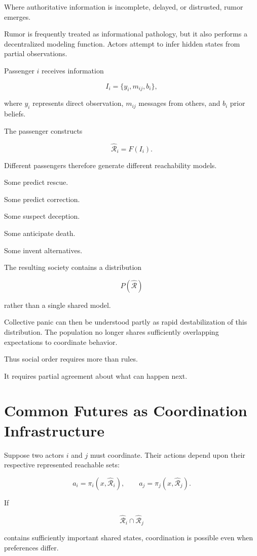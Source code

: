 \documentclass[11pt,oneside]{book}
\theoremstyle{definition}
\theoremstyle{remark}
\newcommand{\R}{\mathcal{R}}
\begin{document}
Where authoritative information is incomplete, delayed, or distrusted, rumor emerges.

Rumor is frequently treated as informational pathology, but it also performs a decentralized modeling function. Actors attempt to infer hidden states from partial observations.

Passenger \(i\) receives information

\[
I_i
=
\{
y_i,
m_{ij},
b_i
\},
\]

where \(y_i\) represents direct observation, \(m_{ij}\) messages from others, and \(b_i\) prior beliefs.

The passenger constructs

\[
\widehat{\R}_i
=
F(I_i).
\]

Different passengers therefore generate different reachability models.

Some predict rescue.

Some predict correction.

Some suspect deception.

Some anticipate death.

Some invent alternatives.

The resulting society contains a distribution

\[
P(\widehat{\R})
\]

rather than a single shared model.

Collective panic can then be understood partly as rapid destabilization of this distribution. The population no longer shares sufficiently overlapping expectations to coordinate behavior.

Thus social order requires more than rules.

It requires partial agreement about what can happen next.

\section{Common Futures as Coordination Infrastructure}

Suppose two actors \(i\) and \(j\) must coordinate. Their actions depend upon their respective represented reachable sets:

\[
a_i
=
\pi_i(x,\widehat{\R}_i),
\qquad
a_j
=
\pi_j(x,\widehat{\R}_j).
\]

If

\[
\widehat{\R}_i
\cap
\widehat{\R}_j
\]

contains sufficiently important shared states, coordination is possible even when preferences differ.
\end{document}
